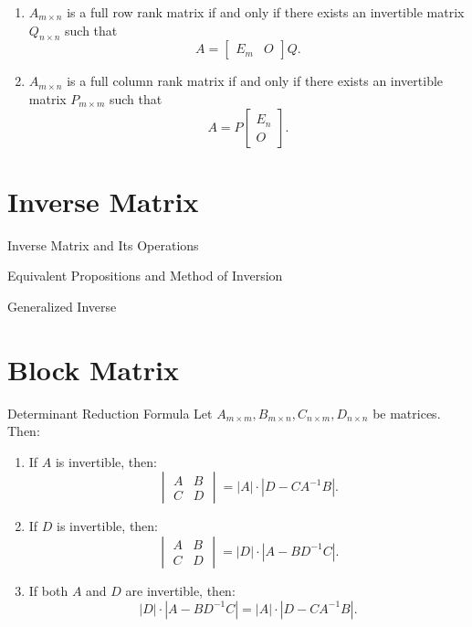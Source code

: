 \documentclass[11pt]{../../TexTemplate/elegantbook} %
\begin{document}
\begin{property}
    \begin{enumerate}
        \item \(A_{m\times n}\) is a full row rank matrix if and only if 
            there exists an invertible matrix \(Q_{n\times n}\) such that 
            \[A = \begin{bmatrix} E_{m} & O \end{bmatrix}Q.\]
        \item \(A_{m\times n}\) is a full column rank matrix if and only if 
            there exists an invertible matrix \(P_{m\times m}\) such that 
            \[A = P\begin{bmatrix} E_{n} \\ O \end{bmatrix}.\]
    \end{enumerate}
\end{property}

\section{Inverse Matrix}
\begin{leftbarTitle}{Inverse Matrix and Its Operations}\end{leftbarTitle}

\begin{leftbarTitle}{Equivalent Propositions and Method of Inversion}\end{leftbarTitle}

\begin{leftbarTitle}{Generalized Inverse}\end{leftbarTitle}

\section{Block Matrix}

\begin{theorem}{Determinant Reduction Formula}
    Let \(A_{m\times m}, B_{m\times n}, C_{n\times m}, D_{n\times n}\) be matrices. Then:
    \begin{enumerate}
        \item If \( A \) is invertible, then:
            \[
            \begin{vmatrix}
            A & B \\
            C & D
            \end{vmatrix}
            = |A| \cdot |D - CA^{-1}B|.
            \]
        \item If \( D \) is invertible, then:
            \[
            \begin{vmatrix}
            A & B \\
            C & D
            \end{vmatrix}
            = |D| \cdot |A - BD^{-1}C|.
            \]
        \item If both \( A \) and \( D \) are invertible, then:
            \[
            |D| \cdot |A - BD^{-1}C| = |A| \cdot |D - CA^{-1}B|.
            \]
    \end{enumerate}
\end{theorem}
\end{document}
